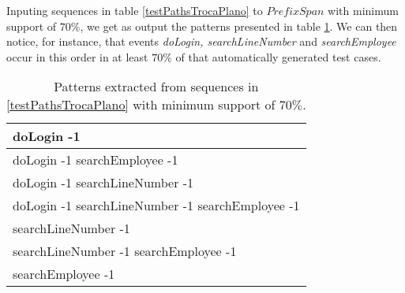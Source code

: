 Inputing sequences in table \ref{testPathsTrocaPlano} to $PrefixSpan$ with minimum support of $70\%$, we get as output the patterns presented in table \ref{patternsTrocaPlano}. We can then notice, for instance, that events \textit{doLogin, searchLineNumber} and \textit{searchEmployee} occur in this order in at least $70\%$ of that automatically generated test cases.

\begin{table}[h]
\begin{center}
\begin{tabular}{|l|}

\hline

doLogin -1  \\ \hline
doLogin -1 searchEmployee -1 \\ \hline
doLogin -1 searchLineNumber -1  \\ \hline
doLogin -1 searchLineNumber -1 searchEmployee -1  \\ \hline
searchLineNumber -1  \\ \hline
searchLineNumber -1 searchEmployee -1  \\ \hline
searchEmployee -1 \\

\hline
\end{tabular}
\end{center}
\caption{Patterns extracted from sequences in \ref{testPathsTrocaPlano} with minimum support of $70\%$.}
\label{patternsTrocaPlano}
\end{table}

